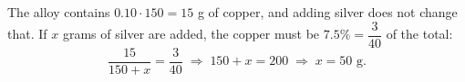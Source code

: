 The alloy contains $0.10\cdot150=15$ g of copper, and adding silver does not change that. If $x$ grams of silver are added, the copper must be $7.5\%=\dfrac{3}{40}$ of the total:
\[
\dfrac{15}{150+x}=\dfrac{3}{40}\;\Longrightarrow\;150+x=200\;\Longrightarrow\;x=\boxed{50}\text{ g}.
\]
